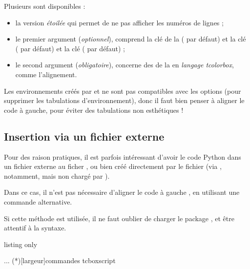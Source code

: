 \begin{cautionblock}
Plusieurs  sont disponibles :

\begin{itemize}
	\item la version \textit{étoilée} qui permet de ne pas afficher les numéros de lignes ;
	\item le premier argument (\textit{optionnel}), comprend la clé  de la  ( par défaut) et la clé  ( par défaut) et la clé  (\Cle{14pt} par défaut) ;
	\item le second argument (\textit{obligatoire}), concerne des  de la  en \textit{langage tcolorbox}, comme l'alignement.
\end{itemize}
\vspace*{-\baselineskip}\leavevmode
\end{cautionblock}

\begin{warningblock}
Les environnements créés par  et  ne sont pas compatibles avec les options  (pour supprimer les tabulations d'environnement), donc il faut bien penser à \og aligner \fg{} le code à gauche, pour éviter des tabulations non esthétiques !
\end{warningblock}

\subsection{Insertion via un fichier \og externe \fg}

\begin{tipblock}
Pour des raison pratiques, il est parfois intéressant d'avoir le code \textsf{Python} dans un fichier externe au ficher , ou bien créé directement par le fichier  (via , notamment, mais non chargé par ).

Dans ce cas, il n'est pas nécessaire d'aligner le code \og à gauche \fg, en utilisant une commande alternative.

\smallskip

Si cette méthode est utilisée, il ne faut oublier de charger le package , et être attentif à la syntaxe.
\end{tipblock}

\begin{PresCodeTexPL}{listing only}
\usepackage{scontents} %
...
\CodePythonLstFichier(*)[largeur]{commandes tcbox}{script}
\end{PresCodeTexPL}

